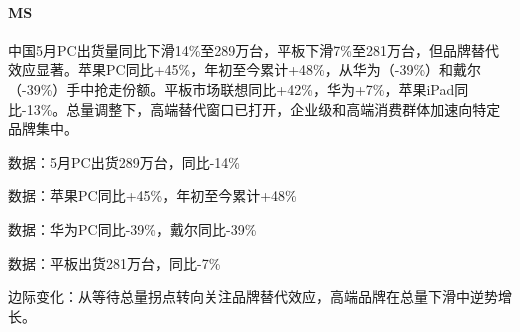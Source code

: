 \documentclass[11pt]{ctexart}
\begin{document}
\paragraph{MS} 中国5月PC出货量同比下滑14\%至289万台，平板下滑7\%至281万台，但品牌替代效应显著。苹果PC同比+45\%，年初至今累计+48\%，从华为（-39\%）和戴尔（-39\%）手中抢走份额。平板市场联想同比+42\%，华为+7\%，苹果iPad同比-13\%。总量调整下，高端替代窗口已打开，企业级和高端消费群体加速向特定品牌集中。
{\small\color{refgray}数据：5月PC出货289万台，同比-14\%\par}
{\small\color{refgray}数据：苹果PC同比+45\%，年初至今累计+48\%\par}
{\small\color{refgray}数据：华为PC同比-39\%，戴尔同比-39\%\par}
{\small\color{refgray}数据：平板出货281万台，同比-7\%\par}
{\small\color{refgray}边际变化：从等待总量拐点转向关注品牌替代效应，高端品牌在总量下滑中逆势增长。\par}
\end{document}
